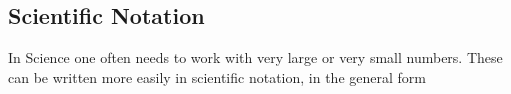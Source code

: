       \label{m30853*uid18}
            \subsection{ Scientific Notation}
            \nopagebreak
            
        
        \label{m30853*id64607}In Science one often needs to work with very large or very small numbers. These can be written more easily in scientific notation, in the general form\par 
        \label{m30853*id64612}\nopagebreak\noindent{}
    
